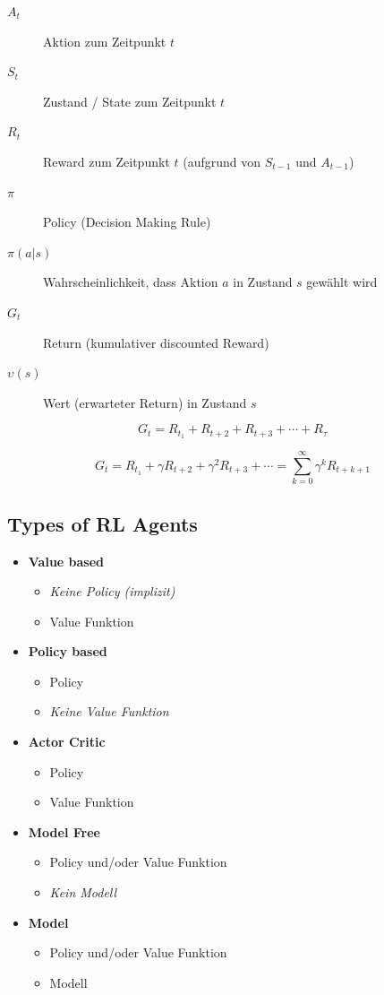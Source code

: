 \documentclass[a4paper]{article}
\begin{document}
		\begin{description}
			\item[$A_t$] Aktion zum Zeitpunkt $t$
			\item[$S_t$] Zustand / State zum Zeitpunkt $t$
			\item[$R_t$] Reward zum Zeitpunkt $t$ (aufgrund von $S_{t-1}$ und $A_{t-1}$)
			\item[$\pi$] Policy (Decision Making Rule)
			\item[$\pi(a|s)$] Wahrscheinlichkeit, dass Aktion $a$ in Zustand $s$ gewählt wird
			\item[$G_t$] Return (kumulativer discounted Reward)
			\item[$\upsilon(s)$] Wert (erwarteter Return) in Zustand $s$
		\end{description}
	
		$$ G_t = R_{t_{1}} + R_{t+2} + R_{t+3} + \cdots + R_{\tau}$$
		
		$$ G_t = R_{t_{1}} + \gamma R_{t+2} + \gamma^{2} R_{t+3} + \cdots = \sum_{k=0}^{\infty} \gamma^{k} R_{t+k+1} $$
	
		\newpage
		
		\subsection{Types of RL Agents}
		
		\begin{itemize}
			\item \textbf{Value based}
				\begin{itemize}
					\item \textit{Keine Policy (implizit)}
					\item Value Funktion
				\end{itemize}
			\item \textbf{Policy based}
				\begin{itemize}
					\item Policy
					\item \textit{Keine Value Funktion}
				\end{itemize}
			\item \textbf{Actor Critic}
				\begin{itemize}
					\item Policy
					\item Value Funktion
				\end{itemize}
			\item \textbf{Model Free}
				\begin{itemize}
					\item Policy und/oder Value Funktion
					\item \textit{Kein Modell}
				\end{itemize}
			\item \textbf{Model}
				\begin{itemize}
					\item Policy und/oder Value Funktion
					\item Modell
				\end{itemize}
		\end{itemize}
	
\end{document}
